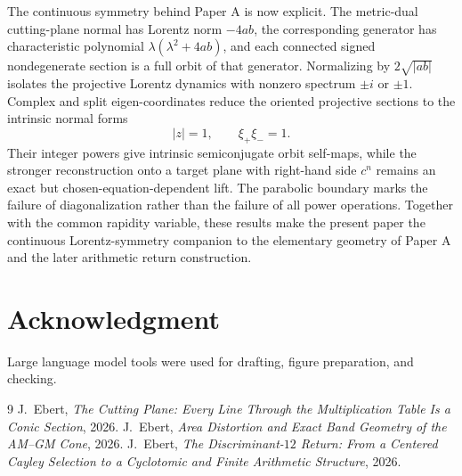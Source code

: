 \documentclass[11pt]{amsart}
\theoremstyle{remark}
\begin{document}
The continuous symmetry behind Paper A is now explicit.  The metric-dual cutting-plane normal has Lorentz norm $-4ab$, the corresponding generator has characteristic polynomial $\lambda(\lambda^2+4ab)$, and each connected signed nondegenerate section is a full orbit of that generator.  Normalizing by $2\sqrt{|ab|}$ isolates the projective Lorentz dynamics with nonzero spectrum $\pm i$ or $\pm1$.  Complex and split eigen-coordinates reduce the oriented projective sections to the intrinsic normal forms
\[
|z|=1,
\qquad
\xi_+\xi_-=1.
\]
Their integer powers give intrinsic semiconjugate orbit self-maps, while the stronger reconstruction onto a target plane with right-hand side $c^n$ remains an exact but chosen-equation-dependent lift.  The parabolic boundary marks the failure of diagonalization rather than the failure of all power operations.  Together with the common rapidity variable, these results make the present paper the continuous Lorentz-symmetry companion to the elementary geometry of Paper A and the later arithmetic return construction.

\section*{Acknowledgment}
Large language model tools were used for drafting, figure preparation, and checking.

\begin{thebibliography}{9}
 J.~Ebert, \emph{The Cutting Plane: Every Line Through the Multiplication Table Is a Conic Section}, 2026.
 J.~Ebert, \emph{Area Distortion and Exact Band Geometry of the AM--GM Cone}, 2026.
 J.~Ebert, \emph{The Discriminant-$12$ Return: From a Centered Cayley Selection to a Cyclotomic and Finite Arithmetic Structure}, 2026.
\end{thebibliography}
\end{document}
